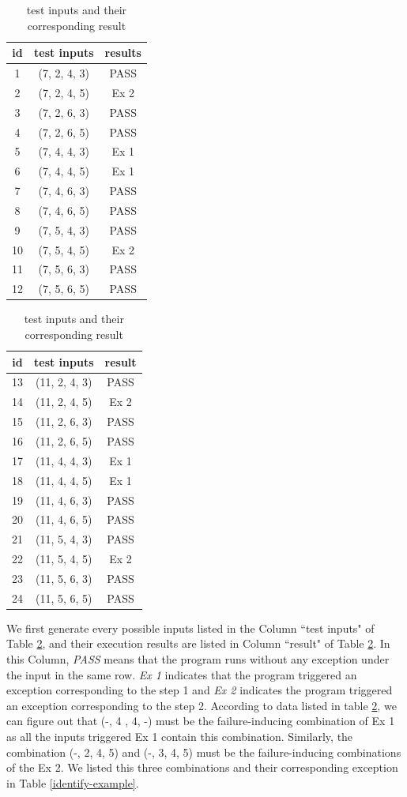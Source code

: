\documentclass{sig-alternate}
\begin{document}
\begin{table}
  \caption{test inputs and their corresponding result}\label{test-example}
  \centering
  \begin{tabular}{ccc}
id&test inputs & results\\\hline
1&(7, 2, 4, 3) &  PASS\\ \hline
2&(7, 2, 4, 5) &  Ex 2\\ \hline
3&(7, 2, 6, 3) &  PASS\\ \hline
4&(7, 2, 6, 5) &  PASS\\ \hline
5&(7, 4, 4, 3) &  Ex 1\\ \hline
6&(7, 4, 4, 5) &  Ex 1\\ \hline
7&(7, 4, 6, 3) &  PASS\\ \hline
8&(7, 4, 6, 5) &  PASS\\ \hline
9&(7, 5, 4, 3) &  PASS\\ \hline
10&(7, 5, 4, 5) &  Ex 2\\ \hline
11&(7, 5, 6, 3) &  PASS\\ \hline
12&(7, 5, 6, 5) &  PASS\\ \hline
  \end{tabular}
  \hspace{1em}
  \begin{tabular}{ccc}
id&test inputs & result\\\hline
13&(11, 2, 4, 3)& PASS\\ \hline
14&(11, 2, 4, 5)& Ex 2\\ \hline
15&(11, 2, 6, 3)& PASS\\ \hline
16&(11, 2, 6, 5)& PASS\\ \hline
17&(11, 4, 4, 3)& Ex 1\\ \hline
18&(11, 4, 4, 5)& Ex 1\\ \hline
19&(11, 4, 6, 3)& PASS\\ \hline
20&(11, 4, 6, 5)& PASS\\ \hline
21&(11, 5, 4, 3)& PASS\\ \hline
22&(11, 5, 4, 5)& Ex 2\\ \hline
23&(11, 5, 6, 3)& PASS\\ \hline
24&(11, 5, 6, 5)& PASS\\ \hline
  \end{tabular}
  \end{table}

We first generate every possible inputs listed in the Column ``test inputs" of Table \ref{test-example}, and their execution results are listed in Column ``result" of Table \ref{test-example}. In this Column, \emph{PASS} means that the program runs without any exception under the input in the same row. \emph{Ex 1} indicates that the program triggered an exception corresponding to the step 1 and \emph{Ex 2} indicates the program triggered an exception corresponding to the step 2. According to data listed in table \ref{test-example}, we can figure out that (-, 4 , 4, -) must be the failure-inducing combination of Ex 1 as all the inputs triggered Ex 1 contain this combination. Similarly, the combination (-, 2, 4, 5) and  (-, 3, 4, 5) must be the failure-inducing combinations of the Ex 2. We listed this three combinations and their corresponding exception in Table \ref{identify-example}.
\end{document}
